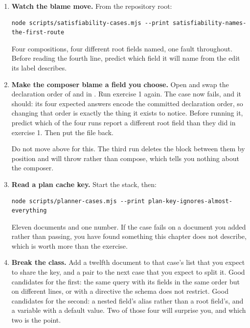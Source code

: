 \begin{enumerate}
  \item \textbf{Watch the blame move.} From the repository root:

  \begin{verbatim}
node scripts/satisfiability-cases.mjs --print satisfiability-names-the-first-route
  \end{verbatim}

  Four compositions, four different root fields named, one fault throughout.
  Before reading the fourth line, predict which field it will name from the
  edit its label describes.

  \item \textbf{Make the composer blame a field you choose.} Open
   and swap the declaration order of
   and  in . Run exercise 1
  again. The case now fails, and it should: its four expected answers encode the
  committed declaration order, so changing that order is exactly the thing it
  exists to notice. Before running it, predict which of the four runs report a
  different root field than they did in exercise 1. Then put the file back.

  Do not move  above  for this. The third
  run deletes the block between them by position and will throw rather than
  compose, which tells you nothing about the composer.

  \item \textbf{Read a plan cache key.} Start the stack, then:

  \begin{verbatim}
node scripts/planner-cases.mjs --print plan-key-ignores-almost-everything
  \end{verbatim}

  Eleven documents and one number. If the case fails on a document you added
  rather than passing, you have found something this chapter does not describe,
  which is worth more than the exercise.

  \item \textbf{Break the class.} Add a twelfth document to that case's list
  that you expect to share the key, and a pair to the next case that you expect
  to split it. Good candidates for the first: the same query with its fields in
  the same order but on different lines, or with a directive the schema does not
  restrict. Good candidates for the second: a nested field's alias rather than a
  root field's, and a variable with a default value. Two of those four will
  surprise you, and which two is the point.


\end{enumerate}
